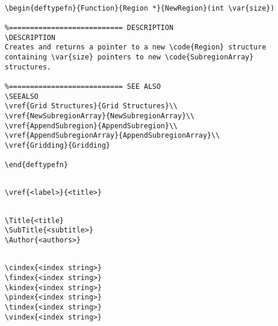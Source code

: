 {\newpage\clearpage
{}%
\begin{display}\begin{verbatim}

\begin{deftypefn}{Function}{Region *}{NewRegion}(int \var{size})

%=========================== DESCRIPTION
\DESCRIPTION
Creates and returns a pointer to a new \code{Region} structure
containing \var{size} pointers to new \code{SubregionArray} structures.

%=========================== SEE ALSO
\SEEALSO
\vref{Grid Structures}{Grid Structures}\\
\vref{NewSubregionArray}{NewSubregionArray}\\
\vref{AppendSubregion}{AppendSubregion}\\
\vref{AppendSubregionArray}{AppendSubregionArray}\\
\vref{Gridding}{Gridding}

\end{deftypefn}\end{verbatim}
\end{display}%
\lthtmlfigureZ
\lthtmlcheckvsize\clearpage}

{\newpage\clearpage
{}%
\begin{display}\begin{verbatim}

\vref{<label>}{<title>}\end{verbatim}
\end{display}%
\lthtmlfigureZ
\lthtmlcheckvsize\clearpage}

{\newpage\clearpage
{}%
\begin{display}\begin{verbatim}

\Title{<title}
\SubTitle{<subtitle>}
\Author{<authors>}\end{verbatim}
\end{display}%
\lthtmlfigureZ
\lthtmlcheckvsize\clearpage}

{\newpage\clearpage
{}%
\begin{display}\begin{verbatim}

\cindex{<index string>}
\findex{<index string>}
\kindex{<index string>}
\pindex{<index string>}
\tindex{<index string>}
\vindex{<index string>}\end{verbatim}
\end{display}%
\lthtmlfigureZ
\lthtmlcheckvsize\clearpage}

